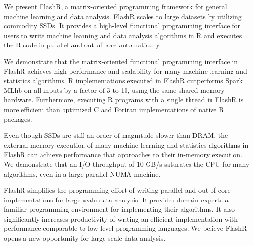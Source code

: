 We present FlashR, a matrix-oriented programming framework for general
machine learning and data analysis. FlashR scales to large datasets by
utilizing commodity SSDs. It provides a high-level functional programming
interface for users to write machine learning and data analysis algorithms
in R and executes the R code in parallel and out of core automatically.

We demonstrate that the matrix-oriented functional programming interface in
FlashR achieves high performance and scalability for many machine learning and 
statistics algorithms.  R implementations executed in FlashR outperforms
Spark MLlib on all inputs by a factor of 3 to 10, using the same shared memory hardware.
Furthermore, executing R programs with a single thread in FlashR is more
efficient than optimized C and Fortran implementations of native R packages.


Even though SSDs are still an order of magnitude slower than DRAM, the external-memory
execution of many machine learning and statistics algorithms in FlashR can achieve performance
that approaches to their in-memory execution. We demonstrate that an I/O throughput
of 10 GB/s saturates the CPU for many algorithms, even in a large parallel
NUMA machine. 

FlashR simplifies the programming effort of writing
parallel and out-of-core implementations for large-scale data analysis. It
provides domain experts a familiar programming environment for implementing
their algorithms. It also significantly
increases productivity of writing an efficient implementation with performance
comparable to low-level programming languages. We believe FlashR opens
a new opportunity for large-scale data analysis.
